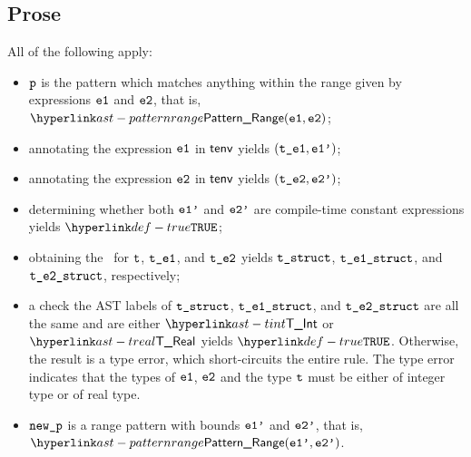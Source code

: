 \subsection{Prose}
All of the following apply:
\begin{itemize}
  \item $\texttt{p}$ is the pattern which matches anything within the range given by
  expressions $\texttt{e1}$ and $\texttt{e2}$, that is, $\PatternRange(\veone, \vetwo)$;
  \item annotating the expression $\texttt{e1}$ in $\textsf{tenv}$ yields $(\texttt{t\_e1}, \texttt{e1'})$\ProseOrTypeError;
  \item annotating the expression $\texttt{e2}$ in $\textsf{tenv}$ yields $(\texttt{t\_e2}, \texttt{e2'})$\ProseOrTypeError;
  \item determining whether both $\texttt{e1'}$ and $\texttt{e2'}$ are compile-time constant expressions yields $\True$\ProseOrTypeError;
  \item obtaining the \structure\ for $\texttt{t}$, $\texttt{t\_e1}$, and $\texttt{t\_e2}$ yields
        $\texttt{t\_struct}$, $\texttt{t\_e1\_struct}$, and $\texttt{t\_e2\_struct}$, respectively\ProseOrTypeError;
  \item a check the AST labels of $\texttt{t\_struct}$, $\texttt{t\_e1\_struct}$, and $\texttt{t\_e2\_struct}$ are all the same and are either
        $\TInt$ or $\TReal$ yields $\True$. Otherwise, the result is a type error, which short-circuits the entire rule.
        The type error indicates that the types of
        $\texttt{e1}$, $\texttt{e2}$ and the type $\texttt{t}$ must be either of integer type or of real type.
  \item $\texttt{new\_p}$ is a range pattern with bounds $\texttt{e1'}$ and $\texttt{e2'}$, that is, $\PatternRange(\veonep, \vetwop)$.
\end{itemize}



